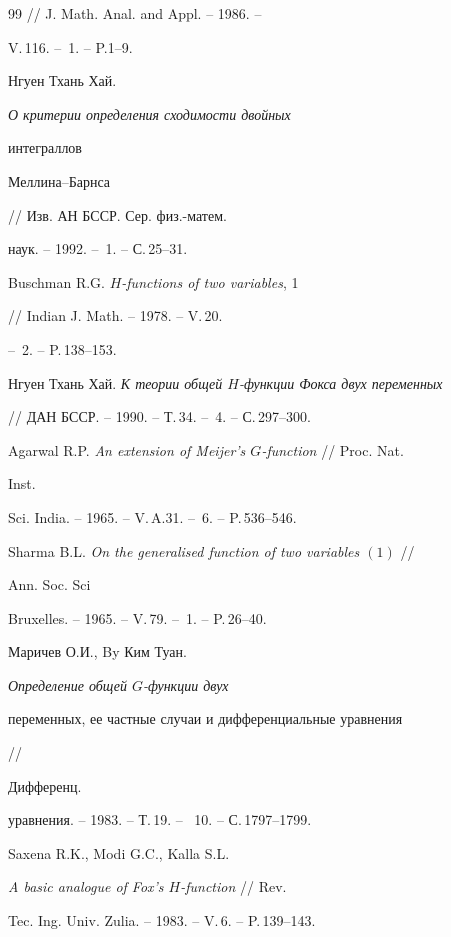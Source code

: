 \begin{thebibliography}{99}
// J. Math. Anal. and Appl. -- 1986. -- 


V.\,116. -- \No\,1. -- P.1--9. 




Нгуен Тхань Хай. {\em О критерии определения сходимости двойных 


интеграллов 


Меллина--Барнса} // Изв. АН БССР. Сер. физ.-матем. 


наук. -- 1992. -- \No\,1. -- С.\,25--31. 




Buschman R.G. {\em $H$-functions of two variables}, 1 


// Indian J. Math. -- 1978. -- V.\,20. 


-- \No\,2. -- P.\,138--153. 




Нгуен Тхань Хай. {\em К теории общей $H$-функции Фокса двух переменных} 


// ДАН БССР. -- 1990. -- Т.\,34. -- \No\,4. -- С.\,297--300. 




Agarwal R.P. {\em An extension of Meijer's $G$-function} // Proc. Nat. 


Inst. 


Sci. India. -- 1965. -- V.\,A.31. -- \No\,6. -- P.\,536--546. 




Sharma B.L. {\em On the generalised function of two variables $(1)$} // 


Ann. Soc. Sci 


Bruxelles. -- 1965. -- V.\,79. -- \No\,1. -- P.\,26--40. 




Маричев О.И., By Ким Туан. {\em Определение общей $G$-функции двух 


переменных, ее частные случаи и дифференциальные уравнения} // 


Дифференц. 


уравнения. -- 1983. -- Т.\,19. -- \No\, 10. -- С.\,1797--1799. 




Saxena R.K., Modi G.C., Kalla S.L. 


{\em A basic analogue of Fox's $H$-function} // Rev. 


Tec. Ing. Univ. Zulia. -- 1983. -- V.\,6. -- P.\,139--143. 





\end{thebibliography}

